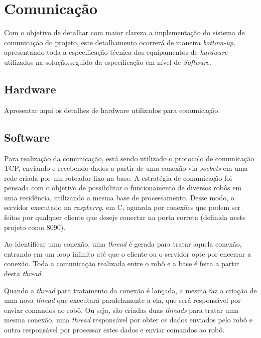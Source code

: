 \section{Comunicação} %
\label{sec:comunicação2}

	Com o objetivo de detalhar com maior clareza a implementação do sistema de comunicação do projeto, este detalhamento ocorrerá de maneira \textit{bottom-up}, apresentando toda a especificação técnica dos equipamentos de \textit{hardware} utilizados na solução,seguido da específicação em nível de \textit{Software}.

	\subsection{Hardware} %
	\label{sub:hardware}
		
		Apresentar aqui os detalhes de hardware utilizados para comunicação.

	\subsection{Software} %
	\label{sub:software}
		
		Para realização da comunicação, está sendo utilizado o protocolo de comunicação TCP, enviando e recebendo dados a partir de uma conexão via \textit{sockets} em uma rede criada por um roteador fixo na base. A estratégia de comunicação foi pensada com o objetivo de possibilitar o funcionamento de diversos robôs em uma residência, utilizando a mesma base de processamento. Desse modo, o servidor executado na \textit{raspberry}, em C, aguarda por conexões que podem ser feitas por qualquer cliente que deseje conectar na porta correta (definida neste projeto como 8090).

		Ao identificar uma conexão, uma \textit{thread} é gerada para tratar aquela conexão, entrando em um loop infinito até que o cliente ou o servidor opte por encerrar a conexão. Toda a comunicação realizada entre o robô e a base é feita a partir desta \textit{thread}.

		Quando a \textit{thread} para tratamento da conexão é lançada, a mesma faz a criação de uma nova \textit{thread} que executará paralelamente a ela, que será responsável por enviar comandos ao robô. Ou seja, são criadas duas \textit{threads} para tratar uma mesma conexão, uma \textit{thread} responsável por obter os dados enviados pelo robô e outra responsável por processar estes dados e enviar comandos ao robô.

